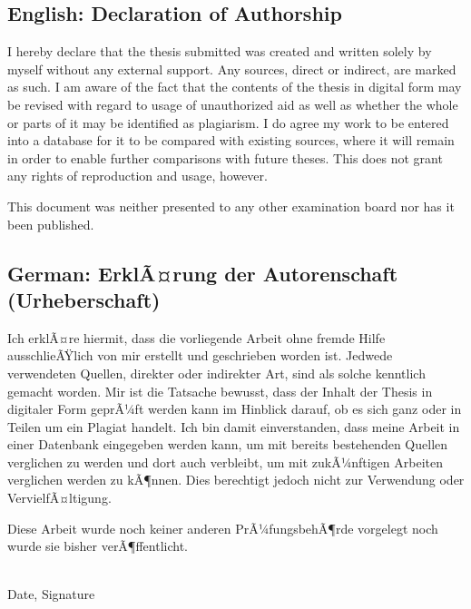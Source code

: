 \documentclass[a4paper,11pt,oneside]{article}
\begin{document}
  \subsection*{English: Declaration of Authorship}
 
  I hereby declare that the thesis submitted was created and written
  solely by myself without any external support. Any sources, direct
  or indirect, are marked as such. I am aware of the fact that the
  contents of the thesis in digital form may be revised with regard to
  usage of unauthorized aid as well as whether the whole or parts of
  it may be identified as plagiarism. I do agree my work to be entered
  into a database for it to be compared with existing sources, where
  it will remain in order to enable further comparisons with future
  theses. This does not grant any rights of reproduction and usage,
  however.

  This document was neither presented to any other examination board
  nor has it been published.

  \subsection*{German: ErklÃ¤rung der Autorenschaft (Urheberschaft)}
 
  Ich erklÃ¤re hiermit, dass die vorliegende Arbeit ohne fremde Hilfe
  ausschlieÃŸlich von mir erstellt und geschrieben worden ist. Jedwede
  verwendeten Quellen, direkter oder indirekter Art, sind als solche
  kenntlich gemacht worden. Mir ist die Tatsache bewusst, dass der
  Inhalt der Thesis in digitaler Form geprÃ¼ft werden kann im Hinblick
  darauf, ob es sich ganz oder in Teilen um ein Plagiat handelt. Ich
  bin damit einverstanden, dass meine Arbeit in einer Datenbank
  eingegeben werden kann, um mit bereits bestehenden Quellen
  verglichen zu werden und dort auch verbleibt, um mit zukÃ¼nftigen
  Arbeiten verglichen werden zu kÃ¶nnen. Dies berechtigt jedoch nicht
  zur Verwendung oder VervielfÃ¤ltigung.

  Diese Arbeit wurde noch keiner anderen PrÃ¼fungsbehÃ¶rde vorgelegt
  noch wurde sie bisher verÃ¶ffentlicht.

  \vspace{20mm}

  \dotfill\\
  Date, Signature

  \newpage
\end{document}
